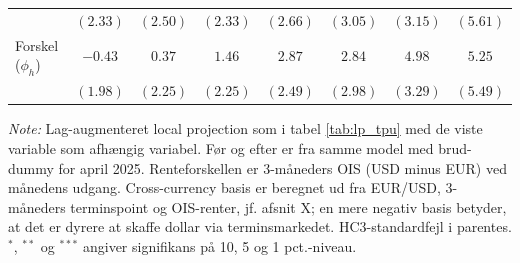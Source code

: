 \begin{table}[H]
\begin{threeparttable}
\begin{tabular}{lccccccc}
 & $(2.33)$ & $(2.50)$ & $(2.33)$ & $(2.66)$ & $(3.05)$ & $(3.15)$ & $(5.61)$ \\
\quad Forskel ($\phi_h$) & $-0.43$ & $0.37$ & $1.46$ & $2.87$ & $2.84$ & $4.98$ & $5.25$ \\
 & $(1.98)$ & $(2.25)$ & $(2.25)$ & $(2.49)$ & $(2.98)$ & $(3.29)$ & $(5.49)$ \\
\bottomrule
\end{tabular}
\begin{tablenotes}[flushleft]\footnotesize
\item \textit{Note:} Lag-augmenteret local projection som i tabel \ref{tab:lp_tpu} med de viste variable
som afhængig variabel. Før og efter er fra samme model med brud-dummy for april 2025. Renteforskellen er
3-måneders OIS (USD minus EUR) ved månedens udgang. Cross-currency basis er beregnet ud fra EUR/USD,
3-måneders terminspoint og OIS-renter, jf. afsnit X; en mere negativ basis betyder, at det er dyrere at
skaffe dollar via terminsmarkedet. HC3-standardfejl i parentes. $^{*}$, $^{**}$ og $^{***}$ angiver
signifikans på 10, 5 og 1 pct.-niveau.
\end{tablenotes}
\end{threeparttable}
\end{table}